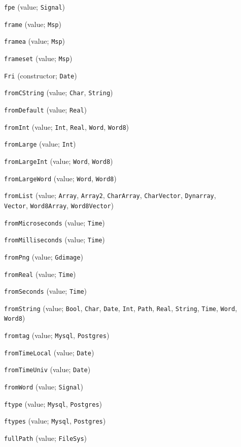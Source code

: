 \begin{description}
\item[] \verb"fpe" (value; \verb"Signal")
\item[] \verb"frame" (value; \verb"Msp")
\item[] \verb"framea" (value; \verb"Msp")
\item[] \verb"frameset" (value; \verb"Msp")
\item[] \verb"Fri" (constructor; \verb"Date")
\item[] \verb"fromCString" (value; \verb"Char", \verb"String")
\item[] \verb"fromDefault" (value; \verb"Real")
\item[] \verb"fromInt" (value; \verb"Int", \verb"Real", \verb"Word", \verb"Word8")
\item[] \verb"fromLarge" (value; \verb"Int")
\item[] \verb"fromLargeInt" (value; \verb"Word", \verb"Word8")
\item[] \verb"fromLargeWord" (value; \verb"Word", \verb"Word8")
\item[] \verb"fromList" (value; \verb"Array", \verb"Array2", \verb"CharArray", \verb"CharVector", \verb"Dynarray", \verb"Vector", \verb"Word8Array", \verb"Word8Vector")
\item[] \verb"fromMicroseconds" (value; \verb"Time")
\item[] \verb"fromMilliseconds" (value; \verb"Time")
\item[] \verb"fromPng" (value; \verb"Gdimage")
\item[] \verb"fromReal" (value; \verb"Time")
\item[] \verb"fromSeconds" (value; \verb"Time")
\item[] \verb"fromString" (value; \verb"Bool", \verb"Char", \verb"Date", \verb"Int", \verb"Path", \verb"Real", \verb"String", \verb"Time", \verb"Word", \verb"Word8")
\item[] \verb"fromtag" (value; \verb"Mysql", \verb"Postgres")
\item[] \verb"fromTimeLocal" (value; \verb"Date")
\item[] \verb"fromTimeUniv" (value; \verb"Date")
\item[] \verb"fromWord" (value; \verb"Signal")
\item[] \verb"ftype" (value; \verb"Mysql", \verb"Postgres")
\item[] \verb"ftypes" (value; \verb"Mysql", \verb"Postgres")
\item[] \verb"fullPath" (value; \verb"FileSys")
\\[2ex]


\end{description}
